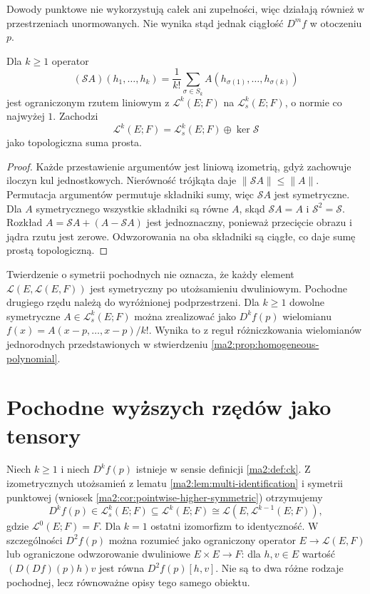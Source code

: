 Dowody punktowe nie wykorzystują całek ani zupełności,
więc działają również w przestrzeniach unormowanych.
Nie wynika stąd jednak ciągłość $D^mf$ w otoczeniu $p$.

\begin{stwierdzenie}
\label{ma2:prop:symmetric-multilinear-projection}
Dla $k\ge1$ operator
\[
 (\mathcal S A)(h_1,\ldots,h_k)
 =\frac1{k!}\sum_{\sigma\in S_k}
 A(h_{\sigma(1)},\ldots,h_{\sigma(k)})
\]
jest ograniczonym rzutem liniowym z $\mathcal L^k(E;F)$
na $\mathcal L_s^k(E;F)$, o normie co najwyżej $1$.
Zachodzi
\[
 \mathcal L^k(E;F)
 =\mathcal L_s^k(E;F)\oplus\ker\mathcal S
\]
jako topologiczna suma prosta.
\end{stwierdzenie}
\begin{proof}
Każde przestawienie argumentów jest liniową izometrią,
gdyż zachowuje iloczyn kul jednostkowych.
Nierówność trójkąta daje $\|\mathcal S A\|\le\|A\|$.
Permutacja argumentów permutuje składniki sumy,
więc $\mathcal S A$ jest symetryczne.
Dla $A$ symetrycznego wszystkie składniki są równe
$A$, skąd $\mathcal S A=A$ i $\mathcal S^2=\mathcal S$.
Rozkład $A=\mathcal S A+(A-\mathcal S A)$
jest jednoznaczny, ponieważ przecięcie obrazu
i jądra rzutu jest zerowe. Odwzorowania na oba
składniki są ciągłe, co daje sumę prostą topologiczną.
\end{proof}

Twierdzenie o symetrii pochodnych nie oznacza,
że każdy element $\mathcal L(E,\mathcal L(E,F))$
jest symetryczny po utożsamieniu dwuliniowym.
Pochodne drugiego rzędu należą do wyróżnionej
podprzestrzeni. Dla $k\ge1$ dowolne symetryczne
$A\in\mathcal L_s^k(E;F)$ można zrealizować jako
$D^kf(p)$ wielomianu
$f(x)=A(x-p,\ldots,x-p)/k!$.
Wynika to z reguł różniczkowania wielomianów
jednorodnych przedstawionych w
stwierdzeniu \ref{ma2:prop:homogeneous-polynomial}.

\section{Pochodne wyższych rzędów jako tensory}
\label{ma2:sec:derivative-tensors}

Niech $k\ge1$ i niech $D^kf(p)$ istnieje w sensie
definicji \ref{ma2:def:ck}. Z izometrycznych
utożsamień z lematu \ref{ma2:lem:multi-identification}
i symetrii punktowej
(wniosek \ref{ma2:cor:pointwise-higher-symmetric})
otrzymujemy
\[
 D^kf(p)\in\mathcal L_s^k(E;F)
 \subseteq\mathcal L^k(E;F)
 \cong\mathcal L(E,\mathcal L^{k-1}(E;F)),
\]
gdzie $\mathcal L^0(E;F)=F$. Dla $k=1$
ostatni izomorfizm to identyczność.
W szczególności $D^2f(p)$ można rozumieć
jako ograniczony operator $E\to\mathcal L(E,F)$
lub ograniczone odwzorowanie dwuliniowe $E\times E\to F$:
dla $h,v\in E$ wartość $(D(Df)(p)h)v$ jest równa
$D^2f(p)[h,v]$. Nie są to dwa różne rodzaje
pochodnej, lecz równoważne opisy tego samego obiektu.

